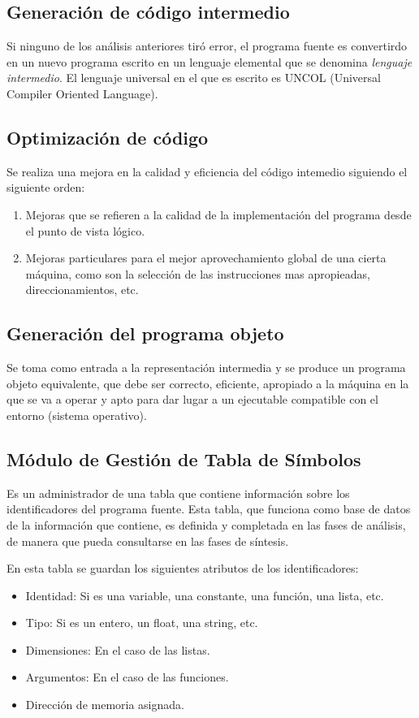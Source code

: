 \documentclass[12pt]{article}
\begin{document}
\subsection{Generación de código intermedio}
Si ninguno de los análisis anteriores tiró error, el programa fuente es convertirdo en un nuevo programa escrito en un lenguaje elemental que se denomina \textit{lenguaje intermedio}. El lenguaje universal en el que es escrito es UNCOL (Universal Compiler Oriented Language).

\subsection{Optimización de código}
Se realiza una mejora en la calidad y eficiencia del código intemedio siguiendo el siguiente orden:
\begin{enumerate}[1.]
	\item Mejoras que se refieren a la calidad de la implementación del programa desde el punto de vista lógico.

	\item Mejoras particulares para el mejor aprovechamiento global de una cierta máquina, como son la selección de las instrucciones mas apropieadas, direccionamientos, etc.
\end{enumerate}

\subsection{Generación del programa objeto}
Se toma como entrada a la representación intermedia y se produce un programa objeto equivalente, que debe ser correcto, eficiente, apropiado a la máquina en la que se va a operar y apto para dar lugar a un ejecutable compatible con el entorno (sistema operativo).

\subsection{Módulo de Gestión de Tabla de Símbolos}
Es un administrador de una tabla que contiene información sobre los identificadores del programa fuente. Esta tabla, que funciona como base de datos de la información que contiene, es definida y completada en las fases de análisis, de manera que pueda consultarse en las fases de síntesis.

En esta tabla se guardan los siguientes atributos de los identificadores:
\begin{itemize}
	\item Identidad: Si es una variable, una constante, una función, una lista, etc.

	\item Tipo: Si es un entero, un float, una string, etc.

	\item Dimensiones: En el caso de las listas.

	\item Argumentos: En el caso de las funciones.

	\item Dirección de memoria asignada.
\end{itemize}
\end{document}
